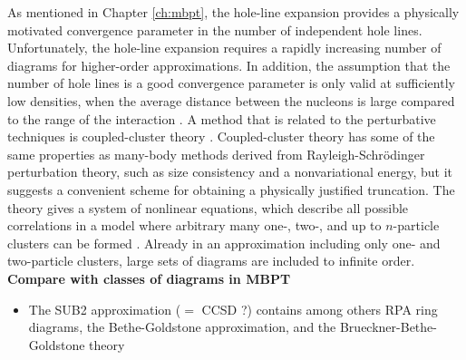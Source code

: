 \documentclass[a4paper,12pt]{report}
\begin{document}
As mentioned in Chapter \ref{ch:mbpt}, the hole-line expansion 
\cite{day1967,raja,rajaraman1963,bethe1965} provides a physically 
motivated convergence parameter in the number of independent hole lines. 
Unfortunately, the hole-line 
expansion requires a rapidly increasing number of diagrams for higher-order
approximations. In addition, the assumption that the number of hole lines 
is a good convergence parameter is only valid at sufficiently low densities, 
when the average distance between the nucleons is large compared to the 
range of the interaction \cite{day1967,muther2000}. A method that is 
related to the perturbative techniques is coupled-cluster theory 
\cite{coester1958,coester1960,bartlett_review}. Coupled-cluster theory has 
some of the same properties as many-body methods derived from 
Rayleigh-Schr{\"o}dinger perturbation theory, such as size consistency and 
a nonvariational energy, but it suggests a convenient scheme for obtaining 
a physically justified truncation. The theory gives a system of nonlinear 
equations, which describe all possible correlations in a model where 
arbitrary many one-, two-, and up to $n$-particle clusters can 
be formed \cite{harris,crawford}. Already in an approximation including
only one- and two-particle clusters, large sets of diagrams are 
included to infinite order. 
\textbf{Compare with classes of diagrams in MBPT}

\begin{itemize}
\item The SUB2 approximation ($=$ CCSD ?) contains among others RPA ring diagrams, the Bethe-Goldstone approximation, and the Brueckner-Bethe-Goldstone theory \cite{bishop1978, bishop_lahoz_1987}
\end{itemize}
\end{document}
